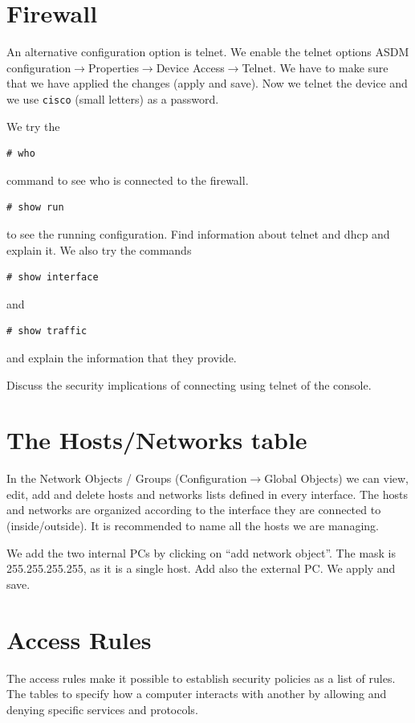 \section{Firewall}
An alternative configuration option is telnet.
We enable the telnet options ASDM configuration$\rightarrow$Properties$\rightarrow$Device Access$\rightarrow$Telnet.
We have to make sure that we have applied the changes (apply and save).
Now we telnet the device and we use \texttt{cisco} (small letters) as a password.

We try the
\begin{lstlisting}
# who
\end{lstlisting}
command to see who is connected to the firewall.
\begin{lstlisting}
# show run
\end{lstlisting}
to see the running configuration.
Find information about telnet and dhcp and explain it.
We also try the commands
\begin{lstlisting}
# show interface
\end{lstlisting}
and
\begin{lstlisting}
# show traffic
\end{lstlisting}
and explain the information that they provide.

Discuss the security implications of connecting using telnet of the console.

\section{The Hosts/Networks table}
In the Network Objects / Groups (Configuration$\rightarrow$Global Objects) we can view, edit, add and delete hosts and networks lists  defined in every interface.
The hosts and networks are organized according to the interface they are connected to (inside/outside).
It is recommended to name all the hosts we are managing.

We add the two internal PCs by clicking on ``add network object''.
The mask is 255.255.255.255, as it is a single host.
Add also the external PC.
We apply and save.

\section{Access Rules}
The access rules make it possible to establish security policies as a list of rules.
The tables to specify how a computer interacts with another by allowing and denying specific services and protocols.

